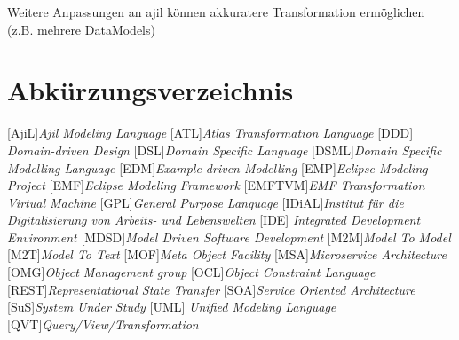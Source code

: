 \documentclass[
	oneside,  %
	ngerman, 
	final, 
	11pt, 
	a4paper, 
	1.1headlines, 
	headinclude=false, 
	footinclude=false, 
	mpinclude=false, 
	pagesize, 
	onecolumn, 
	titlepage, 
	parskip=half, 
	headsepline, 
	chapterprefix=false, 
	version=first, 
	listof=totoc, 
	bibliography=totoc, 
	toc=graduated, 
	fleqn
]{scrbook}
\begin{document}
Weitere Anpassungen an \ac{ajil} können akkuratere Transformation ermöglichen (z.B. mehrere DataModels)
	

\cleardoublepage{}
\chapter*{Abkürzungsverzeichnis}
	\begin{acronym}[NMWC] %
    	\setlength{\itemsep}{-\parsep} %
    	[AjiL]{\textit{Ajil Modeling Language}}
    	[ATL]{\textit{Atlas Transformation Language}}
		 {\textit{Domain-driven Design}}
		[DSL]{\textit{Domain Specific Language}}
		{\textit{Domain Specific Modelling Language}}
		[EDM]{\textit{Example-driven Modelling}}
		[EMP]{\textit{Eclipse Modeling Project}}
		[EMF]{\textit{Eclipse Modeling Framework}}
		[EMFTVM]{\textit{EMF Transformation Virtual Machine}}
		[GPL]{\textit{General Purpose Language}}
		[IDiAL]{\textit{Institut für die Digitalisierung von Arbeits- und Lebenswelten}}
		 {\textit{Integrated Development Environment}}
		{\textit{Model Driven Software Development}}
		[M2M]{\textit{Model To Model}}
		[M2T]{\textit{Model To Text}}
		[MOF]{\textit{Meta Object Facility}}
		[MSA]{\textit{Microservice Architecture}}
		[OMG]{\textit{Object Management group}}
		[OCL]{\textit{Object Constraint Language}}
		{\textit{Representational State Transfer }}
		[SOA]{\textit{Service Oriented Architecture}}
		[SuS]{\textit{System Under Study}}
		 {\textit{Unified Modeling Language}}
		[QVT]{\textit{Query/View/Transformation}}
\end{acronym}

\newpage{}

\cleardoublepage{}
\listoffigures

\newpage{}

\cleardoublepage{}
\listoftables

\lstlistoflistings 
	
\end{document}
